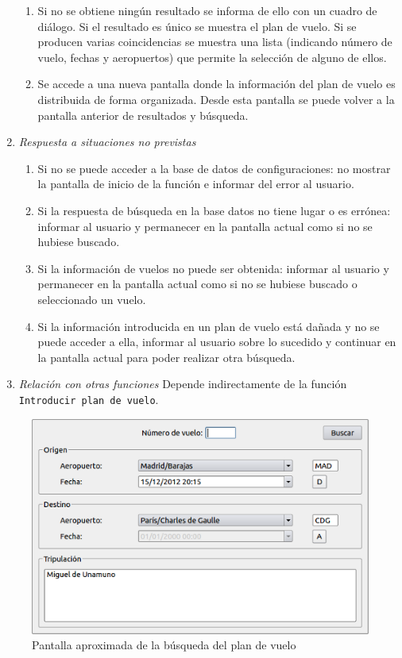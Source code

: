 \begin{enumerate}
\begin{enumerate}
		\item Si no se obtiene ningún resultado se informa de ello con un cuadro de diálogo. Si el resultado es único se muestra el plan de vuelo. Si se producen varias coincidencias se muestra una lista (indicando número de vuelo, fechas y aeropuertos) que permite la selección de alguno de ellos.
		\item Se accede a una nueva pantalla donde la información del plan de vuelo es distribuida de forma organizada. Desde esta pantalla se puede volver a la pantalla anterior de resultados y búsqueda.
	\end{enumerate}
	\item \textit{Respuesta a situaciones no previstas}
	\begin{enumerate}
		\item Si no se puede acceder a la base de datos de configuraciones: no mostrar la pantalla de inicio de la función e informar del error al usuario.
		\item Si la respuesta de búsqueda en la base datos no tiene lugar o es errónea: informar al usuario y permanecer en la pantalla actual como si no se hubiese buscado.
		\item Si la información de vuelos no puede ser obtenida: informar al usuario y permanecer en la pantalla actual como si no se hubiese buscado o seleccionado un vuelo.
		\item Si la información introducida en un plan de vuelo está dañada y no se puede acceder a ella, informar al usuario sobre lo sucedido y continuar en la pantalla actual para poder realizar otra búsqueda.
	\end{enumerate}
	\item \textit{Relación con otras funciones}
		Depende indirectamente de la función \verb|Introducir plan de vuelo|.
\end{enumerate}

\begin{figure}[ht]\centering
\includegraphics[scale=.6]{imagenes/BuscarPlanVuelo.png}
\caption{Pantalla aproximada de la búsqueda del plan de vuelo}
\end{figure}
